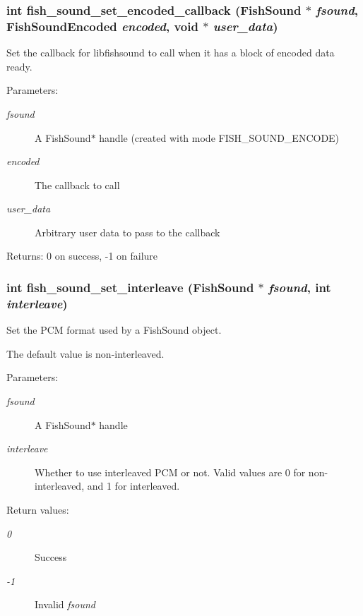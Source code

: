 \subsubsection{\setlength{\rightskip}{0pt plus 5cm}int fish\_\-sound\_\-set\_\-encoded\_\-callback ({\bf Fish\-Sound} $\ast$ {\em fsound}, {\bf Fish\-Sound\-Encoded} {\em encoded}, void $\ast$ {\em user\_\-data})}\label{fishsound_8h_a6}


Set the callback for libfishsound to call when it has a block of encoded data ready. 

\begin{Desc}
\item[Parameters:]
\begin{description}
\item[{\em fsound}]A Fish\-Sound$\ast$ handle (created with mode FISH\_\-SOUND\_\-ENCODE) \item[{\em encoded}]The callback to call \item[{\em user\_\-data}]Arbitrary user data to pass to the callback \end{description}
\end{Desc}
\begin{Desc}
\item[Returns:]0 on success, -1 on failure \end{Desc}
\subsubsection{\setlength{\rightskip}{0pt plus 5cm}int fish\_\-sound\_\-set\_\-interleave ({\bf Fish\-Sound} $\ast$ {\em fsound}, int {\em interleave})}\label{fishsound_8h_a14}


Set the PCM format used by a Fish\-Sound object. 

The default value is non-interleaved. \begin{Desc}
\item[Parameters:]
\begin{description}
\item[{\em fsound}]A Fish\-Sound$\ast$ handle \item[{\em interleave}]Whether to use interleaved PCM or not. Valid values are 0 for non-interleaved, and 1 for interleaved. \end{description}
\end{Desc}
\begin{Desc}
\item[Return values:]
\begin{description}
\item[{\em 0}]Success \item[{\em -1}]Invalid {\em fsound\/} \end{description}
\end{Desc}
